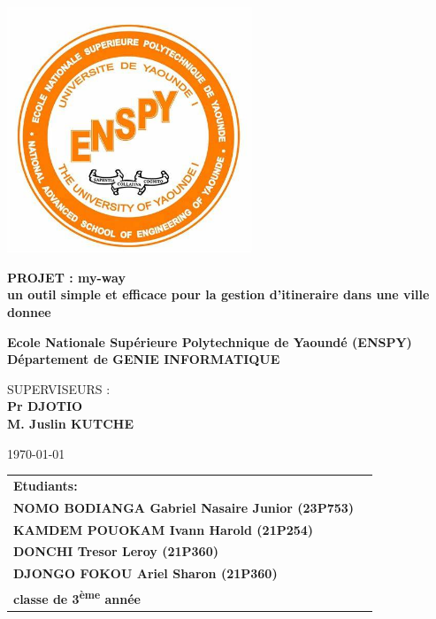\begin{titlepage}
  \centering
  \includegraphics[width=0.55\textwidth]{Images/logo.jpg}\par
  \vspace{0.1cm}

  {\LARGE \textbf{ PROJET : my-way\\un outil simple et efficace pour la gestion d'itineraire dans une ville donnee}\par}
  \vspace{0.2cm}
  {\Large \textbf{Ecole Nationale Supérieure Polytechnique de Yaoundé (ENSPY) \\
      Département de GENIE INFORMATIQUE}\par}
  \vspace{0.2cm}
  {\large SUPERVISEURS :\\
    \textbf{Pr DJOTIO \\ M. Juslin KUTCHE}\par}
  \vspace{0.2cm}
  \today\par
  \vspace{0.10cm}
  \hrulefill\par
  \vspace{0.2cm}
  \begin{table}[!htbp]
    \centering
    \large
    \begin{tabular}{l c}
      \textbf{Etudiants:}                                     & \\
      \textbf{NOMO BODIANGA Gabriel Nasaire Junior (23P753) } & \\
      \textbf{KAMDEM POUOKAM Ivann Harold (21P254)}           & \\
      \textbf{DONCHI Tresor Leroy (21P360)}                   & \\
      \textbf{DJONGO FOKOU Ariel Sharon (21P360) }            & \\

      \textbf{classe de 3\textsuperscript{ème} année}
    \end{tabular}
  \end{table}
  \noindent \hrulefill
\end{titlepage}

